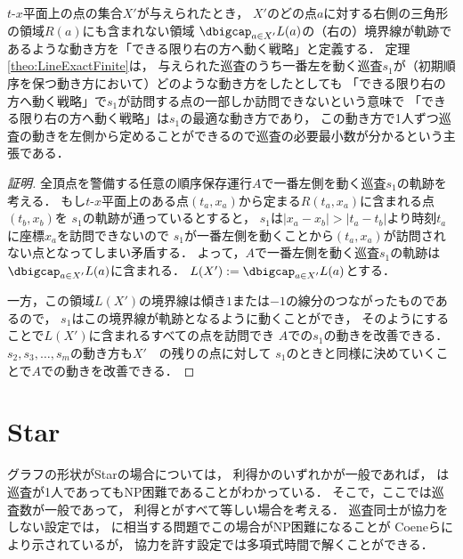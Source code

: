 $t$-$x$平面上の点の集合$X'$が与えられたとき，
$X'$のどの点$a$に対する右側の三角形の領域$R(a)$にも含まれない領域
$\dbigcap_{a \in X'} L(a)$の（右の）境界線が軌跡であるような動き方を「できる限り右の方へ動く戦略」と定義する．
%
定理\ref{theo:LineExactFinite}は，
与えられた巡査のうち一番左を動く巡査$s_1$が（初期順序を保つ動き方において）どのような動き方をしたとしても
「できる限り右の方へ動く戦略」で$s_1$が訪問する点の一部しか訪問できないという意味で
「できる限り右の方へ動く戦略」は$s_1$の最適な動き方であり，
この動き方で1人ずつ巡査の動きを左側から定めることができるので巡査の必要最小数が分かるという主張である．




\begin{proof}[証明]
全頂点を警備する任意の順序保存運行$A$で一番左側を動く巡査$s_1$の軌跡を考える．
%
もし$t$-$x$平面上のある点$(t_a,x_a)$から定まる$R(t_a,x_a)$に含まれる点$(t_b,x_b)$を
$s_1$の軌跡が通っているとすると，
$s_1$は$|x_a - x_b| > |t_a - t_b|$より時刻$t_a$に座標$x_a$を訪問できないので
$s_1$が一番左側を動くことから$(t_a,x_a)$が訪問されない点となってしまい矛盾する．
%
よって，$A$で一番左側を動く巡査$s_1$の軌跡は$\dbigcap_{a \in X'} L(a)$に含まれる．
$L(X') := \dbigcap_{a \in X'} L(a)$とする．

一方，この領域$L(X')$の境界線は傾き$1$または$-1$の線分のつながったものであるので，
$s_1$はこの境界線が軌跡となるように動くことができ，
そのようにすることで$L(X')$に含まれるすべての点を訪問でき
$A$での$s_1$の動きを改善できる．
%
$s_2, s_3, \ldots, s_m$の動き方も$X'$　の残りの点に対して
$s_1$のときと同様に決めていくことで$A$での動きを改善できる．


\end{proof}









\section{Star}
グラフの形状がStarの場合については，
利得か{\idletime}のいずれかが一般であれば，
{\patrolling}は巡査が1人であってもNP困難であることがわかっている\cite{coene2011charlemagne}．
そこで，ここでは巡査数が一般であって，
利得と{\idletime}がすべて等しい場合を考える．
巡査同士が協力をしない設定では，
{\decisionpp}に相当する問題でこの場合がNP困難になることが
Coeneら\cite{coene2011charlemagne}により示されているが，
協力を許す設定では多項式時間で解くことができる．


